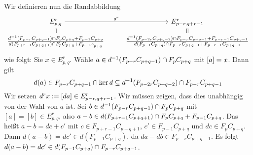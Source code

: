 Wir definieren nun die Randabbildung 
\[
	\begin{tikzcd}[row sep=7pt]
		E^r_{p,q} \rar["d^r"] \dar[equal]& E^r_{p-r,q+r-1} \dar[equal] \\
		\frac{d^{-1} \enbrace*{F_{p-r}C_{p+q-1}} \cap F_p C_{p+q}+ F_{p-1}C_{p+q}}{d \enbrace*{F_{p+r-1}C_{p+q+1} }\cap F_p C_{p+q} + F_{p-1 C_{p+q}}} & 
		\frac{d^{-1} \enbrace*{F_{p-2r}C_{p+q-2}} \cap F_{p-r} C_{p+q-1} + F_{p-r-1}C_{p+q-1}}{d \enbrace*{F_{p-1} C_{p+q}} \cap F_{p-r} C_{p+q-1} + F_{p-r-1} C_{p+q-1} }
	\end{tikzcd}
\]
wie folgt: Sie $x \in E^r_{p,q}$. 
Wähle $a \in d^{-1} \enbrace*{F_{p-r}C_{p+q-1}} \cap F_p C_{p+q}$ mit $\benbrace*{a}= x$.
Dann gilt
\[
	d(a) \in F_{p-r} C_{p+q-1} \cap \ker d \subseteq d^{-1} \enbrace*{F_{p-2r}C_{p+q-2}} \cap F_{p-r} C_{p+q-1}
\]
Wir setzen $d^r x := \benbrace*{d a} \in E^r_{p-r,q+r-1}$. 
Wir müssen zeigen, dass dies unabhängig von der Wahl von $a$ ist.
Sei $b \in d^{-1} \enbrace*{F_{p-r}C_{p+q-1}} \cap F_p C_{p+q}$ mit $[a]=[b] \in E^r_{p,q}$, also $a-b \in d \enbrace*{F_{p+r-1} C_{p+q+1}} \cap F_p C_{p+q} + F_{p-1} C_{p+q}$.
Das heißt $a-b = dc + c'$ mit $c \in F_{p+r-1} C_{p+q+1}$, $c' \in F_{p-1} C_{p+q}$ und $d c \in F_p C_{p+q}$.
Dann $d(a-b) = d c' \in d(F_{p-1} C_{p+q})$, da $da -db \in F_{p-r} C_{p+q-1}$.
Es folgt $d(a-b) = dc' \in d \enbrace*{F_{p-1} C_{p+q}} \cap F_{p-r} C_{p+q-1}$.

